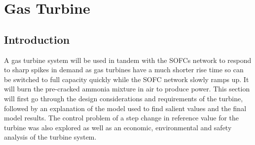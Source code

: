 



%
\section{Gas Turbine}

\subsection{Introduction}\label{sec:intro}
A gas turbine system will be used in tandem with the SOFCs network to respond to sharp spikes in demand as gas turbines have a much shorter rise time so can be switched to full capacity quickly while the SOFC network slowly ramps up. It will burn the pre-cracked ammonia mixture in air to produce power. This section will first go through the design considerations and requirements of the turbine, followed by an explanation of the model used to find salient values and the final model results. The control problem of a step change in reference value for the turbine was also explored as well as an economic, environmental and safety analysis of the turbine system.

